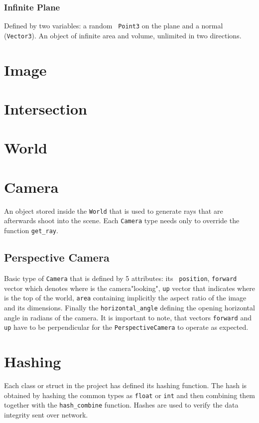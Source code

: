 \documentclass{article}
\begin{document}
	\subsubsection*{Infinite Plane} Defined by two variables: a random {\tt
	Point3} on the plane and a normal ({\tt Vector3}). An object of infinite area
	and volume, unlimited in two directions. 

	\section*{Image}

	\section*{Intersection}

	\section*{World}

	\section*{Camera}
	An object stored inside the {\tt World} that is used to generate rays that
	are afterwards shoot into the scene. Each {\tt Camera} type needs only to
	override the function {\tt get\_ray}.
	\subsection*{Perspective Camera}
	Basic type of {\tt Camera} that is defined by 5 attributes: its {\tt
	position}, {\tt forward} vector which denotes where is the camera"looking",
	{\tt up} vector that indicates where is the top of the world, {\tt area}
	containing implicitly the aspect ratio of the image and its dimensions.
	Finally the {\tt horizontal\_angle} defining the opening horizontal angle in
	radians of the camera.
	It is important to note, that vectors {\tt forward} and {\tt up} have to be
	perpendicular for the {\tt PerspectiveCamera} to operate as expected.

	\section*{Hashing}
	Each class or struct in the project has defined its hashing function. The
	hash is obtained by hashing the common types as {\tt float} or {\tt int} and
	then combining them together with the {\tt hash\_combine} function.
	Hashes are used to verify the data integrity sent over network.
\end{document}
